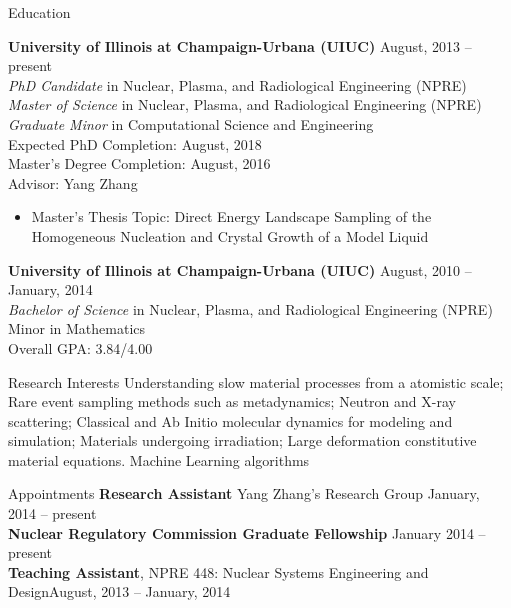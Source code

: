 \documentclass[9pt]{resume} %
\begin{document}

\begin{rSection}{Education}

{\bf University of Illinois at Champaign-Urbana (UIUC)} \hfill {August, 2013 -- present} \\
{\it{PhD Candidate}} in Nuclear, Plasma, and Radiological Engineering (NPRE) \\
{\it{Master of Science}} in Nuclear, Plasma, and Radiological Engineering (NPRE) \\
{\it{Graduate Minor}} in Computational Science and Engineering\\
Expected PhD Completion: August, 2018\\
Master's Degree Completion: August, 2016 \\
Advisor: Yang Zhang
\begin{itemize}
	\item Master's Thesis Topic: Direct Energy Landscape Sampling of the Homogeneous Nucleation and Crystal Growth of a Model Liquid
\end{itemize}

{\bf University of Illinois at Champaign-Urbana (UIUC)} \hfill { August, 2010 -- January, 2014} \\ 
{\it Bachelor of Science} in Nuclear, Plasma, and Radiological Engineering (NPRE) \\
Minor in Mathematics \\
Overall GPA: 3.84/4.00
\end{rSection}

\begin{rSection}{Research Interests}
	Understanding slow material processes from a atomistic scale; Rare event sampling methods such as metadynamics; Neutron and X-ray scattering; Classical and Ab Initio molecular dynamics for modeling and simulation; Materials undergoing irradiation; Large deformation constitutive material equations. Machine Learning algorithms
\end{rSection}

\begin{rSection}{Appointments}
	{\bf Research Assistant} Yang Zhang's Research Group \hfill {January, 2014 -- present} 
	\\
	{\bf Nuclear Regulatory Commission Graduate Fellowship} \hfill {January 2014 -- present}
	\\
	{\bf Teaching Assistant}, NPRE 448: Nuclear Systems Engineering and Design\hfill {August, 2013 -- January, 2014}
\end{rSection}
\end{document}
